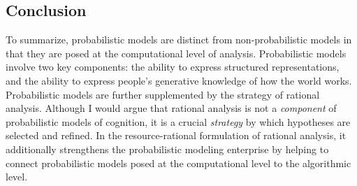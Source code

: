 \documentclass[12pt]{article}
\begin{document}
\subsection*{Conclusion}

To summarize, probabilistic models are distinct from non-probabilistic models in that they are posed at the computational level of analysis. Probabilistic models involve two key components: the ability to express structured representations, and the ability to express people's generative knowledge of how the world works. Probabilistic models are further supplemented by the strategy of rational analysis. Although I would argue that rational analysis is not a \textit{component} of probabilistic models of cognition, it is a crucial \textit{strategy} by which hypotheses are selected and refined. In the resource-rational formulation of rational analysis, it additionally strengthens the probabilistic modeling enterprise by helping to connect probabilistic models posed at the computational level to the algorithmic level.

\end{document}
